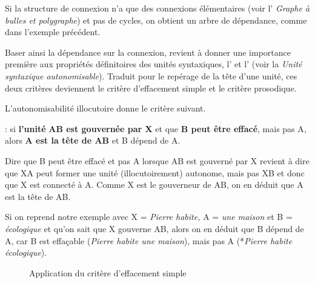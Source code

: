 Si la structure de connexion n’a que des connexions élémentaires (voir l’ \textit{Graphe à bulles et polygraphe}) et pas de cycles, on obtient un arbre de dépendance, comme dans l’exemple précédent.

Baser ainsi la dépendance sur la connexion, revient à donner une importance première aux propriétés définitoires des unités syntaxiques, l’ et l’ (voir la  \textit{Unité syntaxique autonomisable}). Traduit pour le repérage de la tête d’une unité, ces deux critères deviennent le critère d’effacement simple et le critère prosodique.

L’autonomisabilité illocutoire donne le critère suivant.

\begin{styleLivreImportant}
 : si \textbf{l’unité} \textbf{AB est gouvernée par X} et que \textbf{B peut être effacé}, mais pas A, alors \textbf{A est la tête de AB} et B dépend de A.
\end{styleLivreImportant}

Dire que B peut être effacé et pas A lorsque AB est gouverné par X revient à dire que XA peut former une unité (illocutoirement) autonome, mais pas XB et donc que X est connecté à A. Comme X est le gouverneur de AB, on en déduit que A est la tête de AB.

Si on reprend notre exemple avec X = \textit{Pierre habite,} A = \textit{une maison} et B = \textit{écologique} et qu’on sait que X gouverne AB, alors on en déduit que B dépend de A, car B est effaçable (\textit{Pierre habite une maison}), mais pas A (*\textit{Pierre habite écologique}).

\begin{figure}
\caption{\label{fig:}Application du critère d’effacement simple}
\end{figure}

